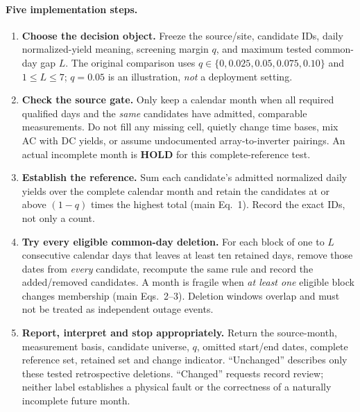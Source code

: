 \documentclass[11pt]{article}
\begin{document}
\paragraph{Five implementation steps.}
\begin{enumerate}
\item \textbf{Choose the decision object.} Freeze the source/site, candidate IDs, daily normalized-yield meaning, screening margin $q$, and maximum tested common-day gap $L$. The original comparison uses $q\in\{0,0.025,0.05,0.075,0.10\}$ and $1\leq L\leq7$; $q=0.05$ is an illustration, \emph{not} a deployment setting.
\item \textbf{Check the source gate.} Only keep a calendar month when all required qualified days and the \emph{same} candidates have admitted, comparable measurements. Do not fill any missing cell, quietly change time bases, mix AC with DC yields, or assume undocumented array-to-inverter pairings. An actual incomplete month is \textbf{HOLD} for this complete-reference test.
\item \textbf{Establish the reference.} Sum each candidate's admitted normalized daily yields over the complete calendar month and retain the candidates at or above $(1-q)$ times the highest total (main Eq.~1). Record the exact IDs, not only a count.
\item \textbf{Try every eligible common-day deletion.} For each block of one to $L$ consecutive calendar days that leaves at least ten retained days, remove those dates from \emph{every} candidate, recompute the same rule and record the added/removed candidates. A month is fragile when \emph{at least one} eligible block changes membership (main Eqs.~2--3). Deletion windows overlap and must not be treated as independent outage events.
\item \textbf{Report, interpret and stop appropriately.} Return the source-month, measurement basis, candidate universe, $q$, omitted start/end dates, complete reference set, retained set and change indicator. ``Unchanged'' describes only these tested retrospective deletions. ``Changed'' requests record review; neither label establishes a physical fault or the correctness of a naturally incomplete future month.
\end{enumerate}
\end{document}
